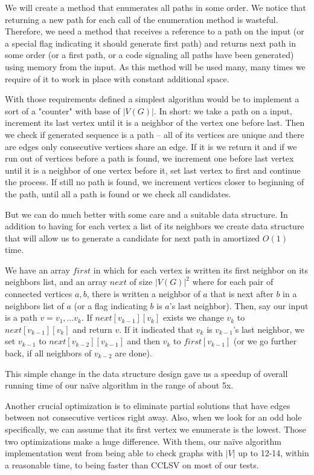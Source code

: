 We will create a method that enumerates all paths in some order. We notice that returning a new path for each call of the enumeration method is wasteful. Therefore, we need a method that receives a reference to a path on the input (or a special flag indicating it should generate first path) and returns next path in some order (or a first path, or a code signaling all paths have been generated) using memory from the input. As this method will be used many, many times we require of it to work in place with constant additional space.

With those requirements defined a simplest algorithm would be to implement a sort of a "counter" with base of $|V(G)|$. In short: we take a path on a input, increment its last vertex until it is a neighbor of the vertex one before last. Then we check if generated sequence is a path -- all of its vertices are unique and there are edges only consecutive vertices share an edge. If it is we return it and if we run out of vertices before a path is found, we increment one before last vertex until it is a neighbor of one vertex before it, set last vertex to first and continue the process. If still no path is found, we increment vertices closer to beginning of the path, until all a path is found or we check all candidates.

But we can do much better with some care and a suitable data structure. In addition to having for each vertex a list of its neighbors we create data structure that will allow us to generate a candidate for next path in amortized $O(1)$ time.

We have an array $first$ in which for each vertex is written its first neighbor on its neighbors list, and an array $next$ of size $|V(G)|^2$ where for each pair of connected vertices $a, b$, there is written a neighbor of $a$ that is next after $b$ in a neighbors list of $a$ (or a flag indicating $b$ is $a$'s last neighbor). Then, say our input is a path $v = v_1, \ldots v_k$. If $next[v_{k-1}][v_k]$ exists we change $v_k$ to $next[v_{k-1}][v_k]$ and return $v$. If it indicated that $v_k$ is $v_{k-1}$'s last neighbor, we set $v_{k-1}$ to $next[v_{k-2}][v_{k-1}]$ and then $v_k$ to $first[v_{k-1}]$ (or we go further back, if all neighbors of $v_{k-2}$ are done).

This simple change in the data structure design gave us a speedup of overall running time of our na\"ive algorithm in the range of about 5x.

Another crucial optimization is to eliminate partial solutions that have edges between not consecutive vertices right away. Also, when we look for an odd hole specifically, we can assume that its first vertex we enumerate is the lowest. Those two optimizations make a huge difference. With them, our na\"ive algorithm implementation went from being able to check graphs with $|V|$ up to 12-14, within a reasonable time, to being faster than CCLSV on most of our tests.

